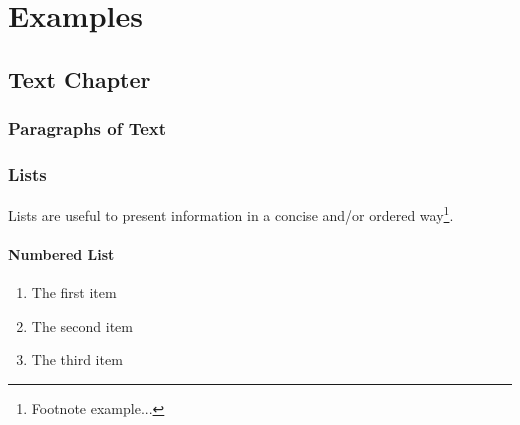 \documentclass[11pt,fleqn,oneside,openany]{book} %
\begin{document}

\part{Examples}



\chapter{Text Chapter}

\section{Paragraphs of Text}

\lipsum[1-7] %





\section{Lists}

Lists are useful to present information in a concise and/or ordered way\footnote{Footnote example...}.

\subsection{Numbered List}

\begin{enumerate}
\item The first item
\item The second item
\item The third item
\end{enumerate}
\end{document}

